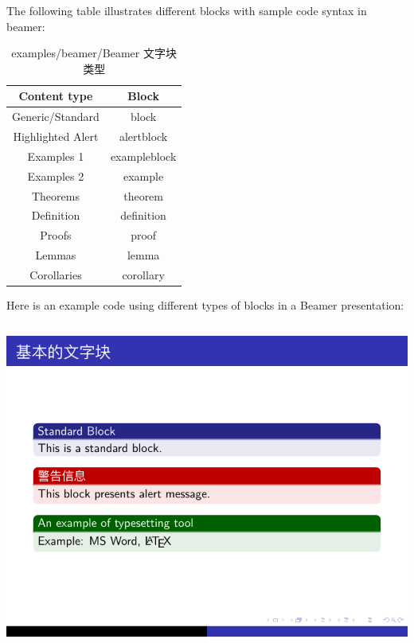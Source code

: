 The following table illustrates different blocks with sample code syntax in beamer:

\begin{table}[!h]
\begin{center}
\caption{examples/beamer/Beamer 文字块类型}
\begin{tabular}{cc}
  \toprule
  Content type &  Block\\
  \midrule
  Generic/Standard	& {\ttfamily block}\\
  Highlighted Alert	& {\ttfamily alertblock}\\
  Examples 1	& {\ttfamily exampleblock}\\
  Examples 2	& {\ttfamily example}\\
  Theorems	& {\ttfamily theorem}\\
  Definition	& {\ttfamily definition}\\
  Proofs	& {\ttfamily proof}\\
  Lemmas	& {\ttfamily lemma}\\
  Corollaries	& {\ttfamily corollary}\\
  \bottomrule
\end{tabular}
\end{center}
\end{table}

Here is an example code using different types of blocks in a Beamer presentation:

\inputminted[linenos=true]{latex}{examples/beamer/beamerblock03.tex}

\includegraphics[page=1]{examples/beamer/beamerblock03.pdf}

